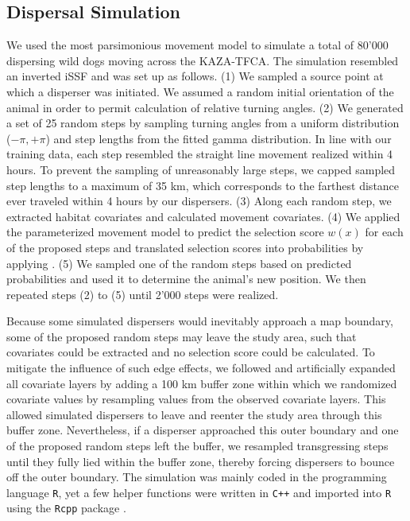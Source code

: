 \documentclass[abstract=on,10pt,a4paper,bibliography=totocnumbered]{article}
\begin{document}
\subsection{Dispersal Simulation}
We used the most parsimonious movement model to simulate a total of 80'000
dispersing wild dogs moving across the KAZA-TFCA. The simulation resembled an
inverted iSSF and was set up as follows. (1) We sampled a source point at which
a disperser was initiated. We assumed a random initial orientation of the animal
in order to permit calculation of relative turning angles. (2) We generated a
set of 25 random steps by sampling turning angles from a uniform distribution
(\(-\pi, +\pi\)) and step lengths from the fitted gamma distribution. In line
with our training data, each step resembled the straight line movement realized
within 4 hours. To prevent the sampling of unreasonably large steps, we capped
sampled step lengths to a maximum of 35 km, which corresponds to the farthest
distance ever traveled within 4 hours by our dispersers. (3) Along each random
step, we extracted habitat covariates and calculated movement covariates. (4) We
applied the parameterized movement model to predict the selection score \(w(x)\)
for each of the proposed steps and translated selection scores into
probabilities by applying . (5) We sampled one of the random steps
based on predicted probabilities and used it to determine the animal's new
position. We then repeated steps (2) to (5) until 2'000 steps were realized.

Because some simulated dispersers would inevitably approach a map boundary, some
of the proposed random steps may leave the study area, such that covariates
could be extracted and no selection score could be calculated. To mitigate the
influence of such edge effects, we followed \citep{Koen.2010} and artificially
expanded all covariate layers by adding a 100 km buffer zone within which we
randomized covariate values by resampling values from the observed covariate
layers. This allowed simulated dispersers to leave and reenter the study area
through this buffer zone. Nevertheless, if a disperser approached this outer
boundary and one of the proposed random steps left the buffer, we resampled
transgressing steps until they fully lied within the buffer zone, thereby
forcing dispersers to bounce off the outer boundary. The simulation was mainly
coded in the programming language {\tt R}, yet a few helper functions were
written in {\tt C++} and imported into {\tt R} using the {\tt Rcpp} package
\citep{Eddelbuettel.2011, Eddelbuettel.2013}.
\end{document}
